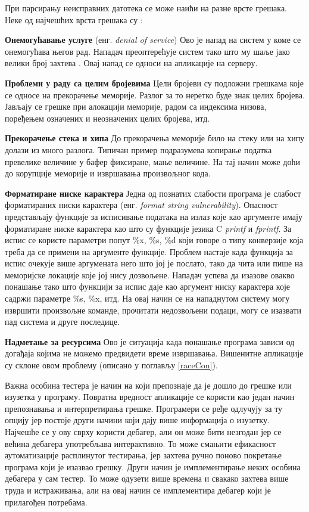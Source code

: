 \documentclass[12pt,oneside]{memoir}
\begin{document}
При парсирању неисправних датотека се може наићи на разне врсте грешака. Неке од најчешћих врста грешака су \cite{fuzzingBrute, fuzzing}:
\begin{description}
\item \textbf{Онемогућавање услуге} (енг. \textit{denial of service}) Ово је напад на систем у коме се онемогућава његов рад. Нападач преоптерећује систем тако што му шаље јако велики број захтева . Овај напад се односи на апликације на серверу.   
\item \textbf{Проблеми у раду са целим бројевима} Цели бројеви су подложни грешкама које се односе на прекорачење меморије. Разлог за то неретко буде знак целих бројева. Јављају се грешке при алокацији меморије, радом са индексима низова, поређењем означених и неозначених целих бројева, итд.
\item \textbf{Прекорачење стека и хипа} До прекорачења меморије било на стеку или на хипу долази из много разлога. Типичан пример подразумева копирање податка превелике величине у бафер фиксиране, мање величине. На тај начин може доћи до корупције меморије и извршавања произвољног кода.
\item \textbf{Форматиране ниске карактера} Једна од познатих слабости програма је слабост форматираних ниски карактера (енг. \textit{format string vulnerability}). Опасност представљају функције за исписивање података на излаз које као аргументе имају форматиране ниске карактера као што су функције језика C \textit{printf} и \textit{fprintf}. За испис се користе параметри попут \%x, \%s, \%d који говоре о типу конверзије која треба да се примени на аргументе функције. Проблем настаје када функција за испис очекује више аргумената него што јој је послато, тако да чита или пише на меморијске локације које јој нису дозвољене. Нападач успева да изазове овакво понашање тако што функцији за испис даје као аргумент ниску карактера које садржи параметре \%s, \%x, итд. На овај начин се на нападнутом систему могу извршити произвољне команде, прочитати недозвољени подаци, могу се изазвати пад система и друге последице. 
\item \textbf{Надметање за ресурсима} Ово је ситуација када понашање програма зависи од догађаја којима не можемо предвидети време извршавања. Вишенитне апликације су склоне овом проблему (описано у поглављу \ref{raceCon}).
\end{description}

Важна особина тестера је начин на који препознаје да је дошло до грешке или изузетка у програму. Повратна вредност апликације се користи као један начин препознавања и  интерпретирања грешке. Програмери се ређе одлучују за ту опцију јер постоје други начини који дају више информација о изузетку. Најчешће се у ову сврху користи дебагер, али он може бити незгодан јер се већина дебагера употребљава интерактивно. То може смањити ефикасност аутоматизације расплинутог тестирања, јер захтева ручно поново покретање програма који је изазвао грешку. Други начин је имплементирање неких особина дебагера у сам тестер. То може одузети више времена и свакако захтева више труда и истраживања, али на овај начин се имплементира дебагер који је прилагођен потребама.
\end{document}
